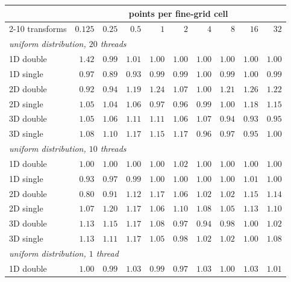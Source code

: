 \begin{table}[p]
    \centering
    \footnotesize
    \setlength{\tabcolsep}{4pt}
    \begin{tabular}{lrrrrrrrrr}
        \toprule
        & \multicolumn{9}{c}{points per fine-grid cell} \\
        \cmidrule(lr){2-10}
        transforms & $0.125$ & $0.25$ & $0.5$ & $1$ & $2$ & $4$ & $8$ & $16$ & $32$ \\
        \midrule
        \multicolumn{10}{l}{\emph{uniform distribution, $20$ threads}} \\
        1D double & $1.42$ & $0.99$ & $1.01$ & $1.00$ & $1.00$ & $1.00$ & $1.00$ & $1.00$ & $1.00$ \\
        1D single & $0.97$ & $0.89$ & $0.93$ & $0.99$ & $0.99$ & $1.00$ & $0.99$ & $1.00$ & $0.99$ \\
        2D double & $0.92$ & $0.94$ & $1.19$ & $1.24$ & $1.07$ & $1.00$ & $1.21$ & $1.26$ & $1.22$ \\
        2D single & $1.05$ & $1.04$ & $1.06$ & $0.97$ & $0.96$ & $0.99$ & $1.00$ & $1.18$ & $1.15$ \\
        3D double & $1.05$ & $1.06$ & $1.11$ & $1.11$ & $1.06$ & $1.07$ & $0.94$ & $0.93$ & $0.95$ \\
        3D single & $1.08$ & $1.10$ & $1.17$ & $1.15$ & $1.17$ & $0.96$ & $0.97$ & $0.95$ & $1.00$ \\
        \midrule
        \multicolumn{10}{l}{\emph{uniform distribution, $10$ threads}} \\
        1D double & $1.00$ & $1.00$ & $1.00$ & $1.00$ & $1.02$ & $1.00$ & $1.00$ & $1.00$ & $1.00$ \\
        1D single & $0.93$ & $0.97$ & $0.99$ & $1.00$ & $1.00$ & $1.00$ & $1.00$ & $1.01$ & $1.00$ \\
        2D double & $0.80$ & $0.91$ & $1.12$ & $1.17$ & $1.06$ & $1.02$ & $1.02$ & $1.15$ & $1.14$ \\
        2D single & $1.07$ & $1.20$ & $1.17$ & $1.06$ & $1.10$ & $1.08$ & $1.05$ & $1.13$ & $1.10$ \\
        3D double & $1.13$ & $1.15$ & $1.17$ & $1.08$ & $0.97$ & $0.94$ & $0.98$ & $1.00$ & $1.02$ \\
        3D single & $1.13$ & $1.11$ & $1.17$ & $1.05$ & $0.98$ & $1.02$ & $1.02$ & $1.00$ & $1.08$ \\
        \midrule
        \multicolumn{10}{l}{\emph{uniform distribution, $1$ thread}} \\
        1D double & $1.00$ & $0.99$ & $1.03$ & $0.99$ & $0.97$ & $1.03$ & $1.00$ & $1.03$ & $1.01$ \\

\end{tabular}
\end{table}
